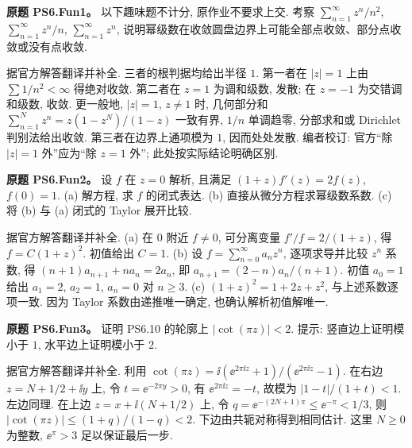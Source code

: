 \begin{exercise}
\textbf{原题 PS6.Fun1。}\label{ass:ps6-fun1}
以下趣味题不计分, 原作业不要求上交. 考察 $\sum_{n=1}^\infty z^n/n^2$, $\sum_{n=1}^\infty z^n/n$, $\sum_{n=1}^\infty z^n$, 说明幂级数在收敛圆盘边界上可能全部点收敛、部分点收敛或没有点收敛.
\end{exercise}
\begin{solution}
据官方解答翻译并补全. 三者的根判据均给出半径 $1$.
第一者在 $|z|=1$ 上由 $\sum1/n^2<\infty$ 得绝对收敛.
第二者在 $z=1$ 为调和级数, 发散; 在 $z=-1$ 为交错调和级数, 收敛. 更一般地, $|z|=1$, $z\ne1$ 时, 几何部分和 $\sum_{n=1}^Nz^n=z(1-z^N)/(1-z)$ 一致有界, $1/n$ 单调趋零, 分部求和或 Dirichlet 判别法给出收敛.
第三者在边界上通项模为 $1$, 因而处处发散. 编者校订: 官方“除 $|z|=1$ 外”应为“除 $z=1$ 外”; 此处按实际结论明确区别.
\end{solution}

\begin{exercise}
\textbf{原题 PS6.Fun2。}\label{ass:ps6-fun2}
设 $f$ 在 $z=0$ 解析, 且满足 $(1+z)f'(z)=2f(z)$, $f(0)=1$.
(a) 解方程, 求 $f$ 的闭式表达.
(b) 直接从微分方程求幂级数系数.
(c) 将 (b) 与 (a) 闭式的 Taylor 展开比较.
\end{exercise}
\begin{solution}
据官方解答翻译并补全.
(a) 在 $0$ 附近 $f\ne0$, 可分离变量 $f'/f=2/(1+z)$, 得 $f=C(1+z)^2$. 初值给出 $C=1$.
(b) 设 $f=\sum_{n=0}^\infty a_nz^n$, 逐项求导并比较 $z^n$ 系数, 得 $(n+1)a_{n+1}+na_n=2a_n$, 即 $a_{n+1}=(2-n)a_n/(n+1)$. 初值 $a_0=1$ 给出 $a_1=2$, $a_2=1$, $a_n=0$ 对 $n\ge3$.
(c) $(1+z)^2=1+2z+z^2$, 与上述系数逐项一致. 因为 Taylor 系数由递推唯一确定, 也确认解析初值解唯一.
\end{solution}

\begin{exercise}
\textbf{原题 PS6.Fun3。}\label{ass:ps6-fun3}
证明 PS6.10 的轮廓上 $|\cot(\pi z)|<2$. 提示: 竖直边上证明模小于 $1$, 水平边上证明模小于 $2$.
\end{exercise}
\begin{solution}
据官方解答翻译并补全. 利用 $\cot(\pi z)=\ii(\ee^{2\pi\ii z}+1)/(\ee^{2\pi\ii z}-1)$.
在右边 $z=N+1/2+\ii y$ 上, 令 $t=\ee^{-2\pi y}>0$, 有 $\ee^{2\pi\ii z}=-t$, 故模为 $|1-t|/(1+t)<1$. 左边同理.
在上边 $z=x+\ii(N+1/2)$ 上, 令 $q=\ee^{-(2N+1)\pi}\le\ee^{-\pi}<1/3$, 则
$|\cot(\pi z)|\le(1+q)/(1-q)<2$. 下边由共轭对称得到相同估计. 这里 $N\ge0$ 为整数, $\ee^{\pi}>3$ 足以保证最后一步.
\end{solution}

